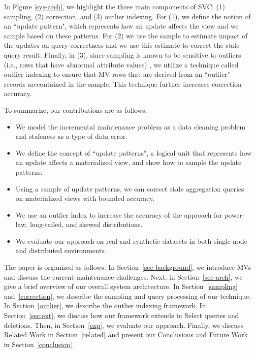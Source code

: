 In Figure \ref{sys-arch}, we highlight the three main components of SVC: (1) sampling, (2) correction, and (3) outlier indexing. For (1), we define the notion of an ``update pattern", which represents how an update affects the view and we sample based on these patterns. For (2) we use the sample to estimate impact of the updates on query correctness and we use this estimate to correct the stale query result.
Finally, in (3), since sampling is known to be sensitive to outliers (i.e., rows that have abnormal attribute values) \cite{chaudhuri2001overcoming}, we
utilize a technique called outlier indexing \cite{chaudhuri2001overcoming} to ensure that MV rows that are derived from an ``outlier" records arecontained in the sample.  This technique further increases correction accuracy.

To summarize, our contributions are as follows:

\begin{itemize}\vspace{-.45em}
\item We model the incremental maintenance problem as a data cleaning problem and staleness as a type of data error.\vspace{-.45em}
\item We define the concept of ``update patterns", a logical unit that represents how an update affects a materialized view, and show how to sample the update patterns. \vspace{-.45em}
\item Using a sample of update patterns, we can correct stale aggregation queries on materialized views with bounded accuracy.\vspace{-.45em}
\item We use an outlier index to increase the accuracy of the approach for power-law, long-tailed, and skewed distributions.\vspace{-.45em}
\item We evaluate our approach on real and synthetic datasets in both single-node and distributed environments.\vspace{-.45em}
\end{itemize}

The paper is organized as follows: 
In Section~\ref{sec-background}, we introduce MVs and discuss the current maintenance challenges.
Next, in Section~\ref{sec-arch}, we give a brief overview of our overall system architecture.
In Section~\ref{sampling} and~\ref{correction}, we describe the sampling and query processing of our technique.
In Section~\ref{outlier}, we describe the outlier indexing framework.
In Section~\ref{sec:ext}, we discuss how our framework extends to Select queries and deletions.
Then, in Section~\ref{exp}, we evaluate our approach.
Finally, we discuss Related Work in Section~\ref{related} and present our Conclusions and Future Work in Section~\ref{conclusion}.
